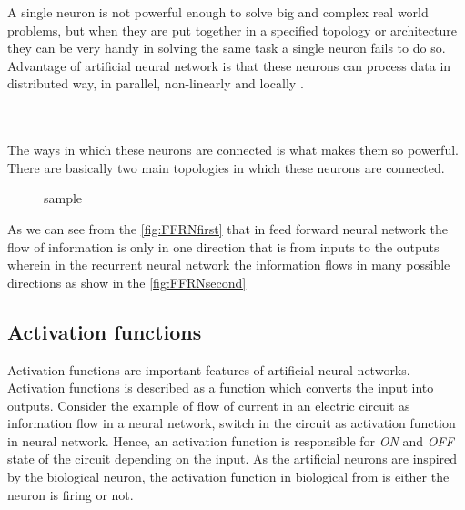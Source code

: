 A single neuron is not powerful enough to solve big and complex real world problems, but when they are put together in a specified topology or architecture they can be very handy in solving the same task a single neuron fails to do so. Advantage of artificial neural network is that these neurons can process data in distributed way, in parallel, non-linearly and locally \cite{andrej2011introduction}.
\\
\\
\\
\par
The ways in which these neurons are connected is what makes them so powerful. There are basically two main topologies in which these neurons are connected. 
\begin{figure}[!ht]%
\centering
{}%
\qquad
{}%
\caption{sample}
\label{fig:FFRN}
\end{figure}

As we can see from the \ref{fig:FFRNfirst} that in feed forward neural network the flow of information is only in one direction that is from inputs to the outputs wherein in the recurrent neural network the information flows in many possible directions as show in the  \ref{fig:FFRNsecond}

\subsection*{Activation functions}
Activation functions are important features of artificial neural networks. Activation functions is described as a function which converts the input into outputs. Consider the example of flow of current in an electric circuit as information flow in a neural network, switch in the circuit as activation function in neural network. Hence, an activation function is responsible for \textit{ON} and \textit{OFF} state of the circuit depending on the input. As the artificial neurons are inspired by the biological neuron, the activation function in biological from is either the neuron is firing or not.   

